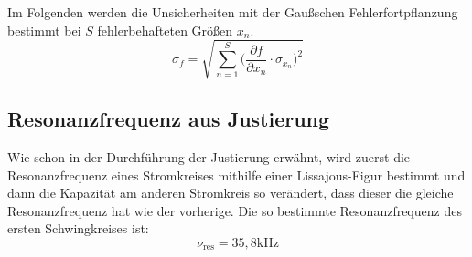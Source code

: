 \documentclass[titlepage = firstcover]{scrartcl}
\begin{document}
        \noindent
        Im Folgenden werden die Unsicherheiten mit der Gaußschen Fehlerfortpflanzung bestimmt bei $S$ fehlerbehafteten Größen $x_n$.
        \begin{equation}
            \sigma_f = \sqrt{\sum_{n=1}^{S} \biggl(\frac{\partial f}{\partial x_n} \cdot \sigma_{x_n} \biggr)^2}
            \label{eqn:gauß}
        \end{equation}
    
    \subsection{Resonanzfrequenz aus Justierung}
        Wie schon in der Durchführung der Justierung erwähnt, wird zuerst die Resonanzfrequenz eines Stromkreises mithilfe einer Lissajous-Figur bestimmt und 
        dann die Kapazität am anderen Stromkreis so verändert, dass dieser die gleiche Resonanzfrequenz hat wie der vorherige. Die so bestimmte Resonanzfrequenz
        des ersten Schwingkreises ist:
        \begin{equation}
            \nu_{\text{res}} = 35,8 \text{kHz}
        \end{equation}
\end{document}
